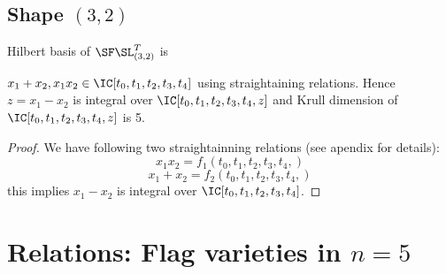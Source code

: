 %

%

\subsection{Shape \((3,2)\)}
Hilbert basis of \(\SF\SL_{(3,2)}^T\) is 
    
\begin{lemma}
    \(x_1+x_2,x_1x_2 \in \IC[t_0,t_1,t_2,t_3,t_4]\) using straightaining relations. Hence \(z = x_1-x_2\) is integral over \(\IC[t_0,t_1,t_2,t_3,t_4,z]\) and Krull dimension of \(\IC[t_0,t_1,t_2,t_3,t_4,z]\) is 5.
\end{lemma}
\begin{proof}
    We have following two straightainning relations (see apendix for details):
    \[x_1x_2  = f_1(t_0,t_1,t_2,t_3,t_4,)\]
    \[x_1+x_2 = f_2(t_0,t_1,t_2,t_3,t_4,)\]
    this implies \(x_1-x_2\) is integral over \(\IC[t_0,t_1,t_2,t_3,t_4]\).
\end{proof}

\section{Relations: Flag varieties in \(n = 5\)}
